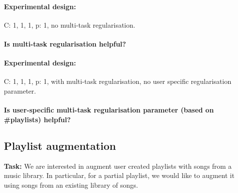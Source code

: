 \paragraph{Experimental design:}
C: 1, 1, 1, p: 1, no multi-task regularisation.

\paragraph{Is multi-task regularisation helpful?}

\begin{table}[!h]
\centering
\caption{Empirical results}
\end{table}

\paragraph{Experimental design:}
C: 1, 1, 1, p: 1, with multi-task regularisation, no user specific regularisation parameter.

\paragraph{Is user-specific multi-task regularisation parameter (based on \#playlists) helpful?}
\begin{table}[!h]
\centering
\caption{Empirical results}
\end{table}



\subsection{Playlist augmentation}

{\bf Task:}
We are interested in augment user created playlists with songs from a music library.
In particular, for a partial playlist, we would like to augment it using songs from an existing library of songs.

